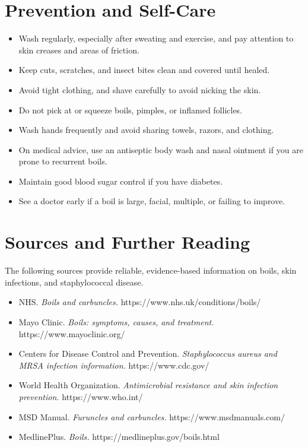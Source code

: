 \section*{Prevention and Self-Care}
\begin{itemize}
    \item Wash regularly, especially after sweating and exercise, and pay attention to skin creases and areas of friction.
    \item Keep cuts, scratches, and insect bites clean and covered until healed.
    \item Avoid tight clothing, and shave carefully to avoid nicking the skin.
    \item Do not pick at or squeeze boils, pimples, or inflamed follicles.
    \item Wash hands frequently and avoid sharing towels, razors, and clothing.
    \item On medical advice, use an antiseptic body wash and nasal ointment if you are prone to recurrent boils.
    \item Maintain good blood sugar control if you have diabetes.
    \item See a doctor early if a boil is large, facial, multiple, or failing to improve.
\end{itemize}

\section*{Sources and Further Reading}
The following sources provide reliable, evidence-based information on boils, skin infections, and staphylococcal disease.
\begin{itemize}
    \item NHS. \textit{Boils and carbuncles.} https://www.nhs.uk/conditions/boils/
    \item Mayo Clinic. \textit{Boils: symptoms, causes, and treatment.} https://www.mayoclinic.org/
    \item Centers for Disease Control and Prevention. \textit{Staphylococcus aureus and MRSA infection information.} https://www.cdc.gov/
    \item World Health Organization. \textit{Antimicrobial resistance and skin infection prevention.} https://www.who.int/
    \item MSD Manual. \textit{Furuncles and carbuncles.} https://www.msdmanuals.com/
    \item MedlinePlus. \textit{Boils.} https://medlineplus.gov/boils.html
\end{itemize}
